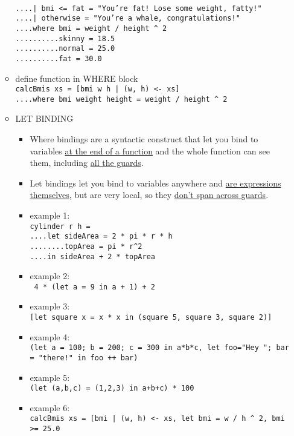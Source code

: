 \documentclass[a4paper,10pt]{article}
\begin{document}
\begin{enumerate}
\begin{itemize}
   \\\texttt{....| bmi <= fat = "You're fat! Lose some weight, fatty!"}
   \\\texttt{....| otherwise = "You're a whale, congratulations!"}
   \\\texttt{....where bmi = weight / height \^{} 2}
   \\\texttt{..........skinny = 18.5}
   \\\texttt{..........normal = 25.0}
   \\\texttt{..........fat = 30.0}
   \item define function in WHERE block
   \\\texttt{calcBmis xs = [bmi w h | (w, h) <- xs]}
   \\\texttt{....where bmi weight height = weight / height \^{} 2}
   \item LET BINDING
   \begin{itemize}
    \item Where bindings are a syntactic construct that let you bind to variables \underline{at the end of a function} and the whole function can see them, including \underline{all the guards}.
    \item Let bindings let you bind to variables anywhere and \underline{are expressions themselves}, but are very local, so they \underline{don't span across guards}.
    \item example 1:
    \\\texttt{cylinder r h =}
    \\\texttt{....let sideArea = 2 * pi * r * h}
    \\\texttt{........topArea = pi * r\^{}2}
    \\\texttt{....in sideArea + 2 * topArea}
    \item example 2:
    \\\texttt{ 4 * (let a = 9 in a + 1) + 2}
    \item example 3:
    \\\texttt{[let square x = x * x in (square 5, square 3, square 2)]}
    \item example 4:
    \\\texttt{(let a = 100; b = 200; c = 300 in a*b*c, let foo="Hey "; bar = "there!" in foo ++ bar)}
    \item example 5:
    \\\texttt{(let (a,b,c) = (1,2,3) in a+b+c) * 100}
    \item example 6:
    \\\texttt{calcBmis xs = [bmi | (w, h) <- xs, let bmi = w / h \^{} 2, bmi >= 25.0}

\end{itemize}
\end{itemize}
\end{enumerate}
\end{document}
